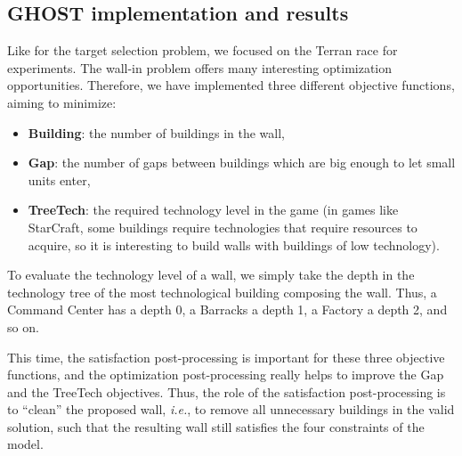 \documentclass[journal]{IEEEtran}
\newcommand{\ghost}{\textsc{GHOST}\xspace}
\newcommand{\ie}{\textit{i.e.}}
\begin{document}
\subsection{\ghost implementation and results}

Like for the  target selection problem, we focused on  the Terran race
for  experiments.   The  wall-in   problem  offers   many  interesting
optimization  opportunities.  Therefore,  we  have  implemented  three
different objective functions, aiming to minimize:
\begin{itemize}
\item {\bf Building}: the number of buildings in the wall,
\item {\bf  Gap}: the number of  gaps between buildings which  are big
  enough to let small units enter,
\item {\bf  TreeTech}: the required  technology level in the  game (in
  games  like  StarCraft,  some buildings  require  technologies  that
  require resources  to acquire, so  it is interesting to  build walls
  with buildings of low technology).
\end{itemize}

To evaluate the  technology level of a wall, we  simply take the depth
in the  technology tree of  the most technological  building composing
the wall. Thus, a Command Center has  a depth 0, a Barracks a depth 1,
a Factory a depth 2, and so on.

This  time, the  satisfaction post-processing  is important  for these
three objective functions, and the optimization post-processing really
helps to improve the Gap and  the TreeTech objectives.  Thus, the role
of the satisfaction post-processing is to ``clean'' the proposed wall,
\ie, to remove  all unnecessary buildings in the  valid solution, such
that the  resulting wall still  satisfies the four constraints  of the
model.
\end{document}
